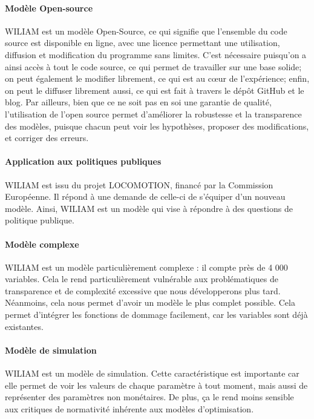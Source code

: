 \paragraph{Modèle Open-source} WILIAM est un modèle Open-Source, ce qui signifie que l'ensemble du code source est disponible en ligne, avec une licence permettant une utilisation, diffusion et modification du programme sans limites. C'est nécessaire puisqu'on a ainsi accès à tout le code source, ce qui permet de travailler sur une base solide; on peut également le modifier librement, ce qui est au cœur de l'expérience; enfin, on peut le diffuser librement aussi, ce qui est fait à travers le dépôt GitHub et le blog. Par ailleurs, bien que ce ne soit pas en soi une garantie de qualité, l'utilisation de l'open source permet d'améliorer la robustesse et la transparence des modèles, puisque chacun peut voir les hypothèses, proposer des modifications, et corriger des erreurs. 

\paragraph{Application aux politiques publiques} WILIAM est issu du projet LOCOMOTION, financé par la Commission Européenne. Il répond à une demande de celle-ci de s'équiper d'un nouveau modèle. Ainsi, WILIAM est un modèle qui vise à répondre à des questions de politique publique. 

\paragraph{Modèle complexe} WILIAM est un modèle particulièrement complexe : il compte près de 4 000 variables. Cela le rend particulièrement vulnérable aux problématiques de transparence et de complexité excessive que nous développerons plus tard. Néanmoins, cela nous permet d'avoir un modèle le plus complet possible. Cela permet d'intégrer les fonctions de dommage facilement, car les variables sont déjà existantes. 

\paragraph{Modèle de simulation} WILIAM est un modèle de simulation. Cette caractéristique est importante car elle permet de voir les valeurs de chaque paramètre à tout moment, mais aussi de représenter des paramètres non monétaires. De plus, ça le rend moins sensible aux critiques de normativité inhérente aux modèles d'optimisation. 

